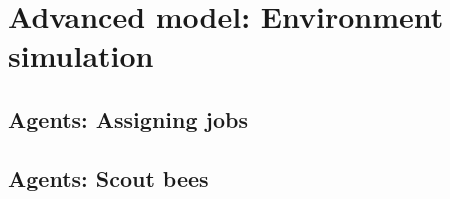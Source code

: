 \documentclass[
	paper=128mm:96mm,
	fontsize=11pt,
	pagesize,
	parskip=half-,
]{scrartcl}
\theoremstyle{mythmstyle} %
\begin{document}
\section{Advanced model: Environment simulation}
	
	\clearpage
\subsection*{Agents: Assigning jobs}
	
	\clearpage
\subsection*{Agents: Scout bees}
	
	\clearpage
\end{document}
